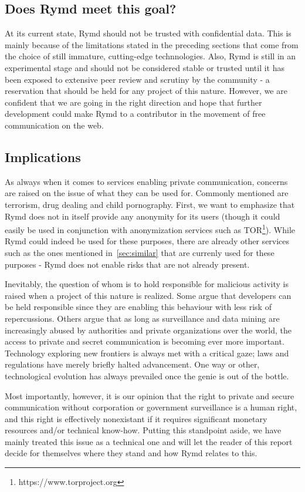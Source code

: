 \subsection{Does Rymd meet this goal?}
At its current state, Rymd should not be trusted with confidential data. This is mainly because of the limitations stated in the preceding sections that come from the choice of still immature, cutting-edge technnologies. Also, Rymd is still in an experimental stage and should not be considered stable or trusted until it has been exposed to extensive peer review and scrutiny by the community - a reservation that should be held for any project of this nature. However, we are confident that we are going in the right direction and hope that further development could make Rymd to a contributor in the movement of free communication on the web.

\subsection{Implications}
As always when it comes to services enabling private communication, concerns are raised on the issue of what they can be used for. Commonly mentioned are terrorism, drug dealing and child pornography. First, we want to emphasize that Rymd does not in itself provide any anonymity for its users (though it could easily be used in conjunction with anonymization services such as TOR\footnote{https://www.torproject.org}). While Rymd could indeed be used for these purposes, there are already other services such as the ones mentioned in~\ref{sec:similar} that are currenly used for these purposes - Rymd does not enable risks that are not already present.

Inevitably, the question of whom is to hold responsible for malicious activity is raised when a project of this nature is realized. Some argue that developers can be held responsible since they are enabling this behaviour with less risk of repercussions. Others argue that as long as surveillance and data mining are increasingly abused by authorities and private organizations over the world, the access to private and secret communication is becoming ever more important. Technology exploring new frontiers is always met with a critical gaze; laws and regulations have merely briefly halted advancement. One way or other, technological evolution has always prevailed once the genie is out of the bottle. 

Most importantly, however, it is our opinion that the right to private and secure communication without corporation or government surveillance is a human right, and this right is effectively nonexistant if it requires significant monetary resources and/or technical know-how. Putting this standpoint aside, we have mainly treated this issue as a technical one and will let the reader of this report decide for themselves where they stand and how Rymd relates to this.

